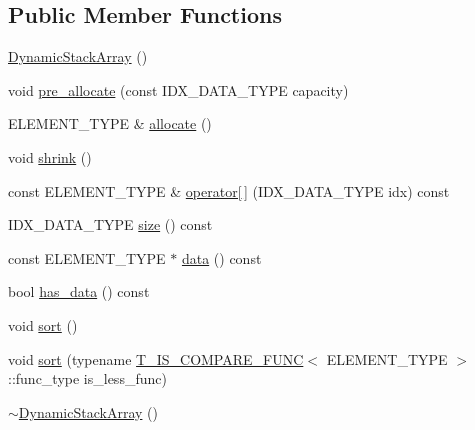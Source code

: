 \subsection*{Public Member Functions}
\begin{DoxyCompactItemize}
\item 
\hyperlink{classuva_1_1utils_1_1containers_1_1_dynamic_stack_array_a559a9117409413c793d43d430b0cf48e}{Dynamic\+Stack\+Array} ()
\item 
void \hyperlink{classuva_1_1utils_1_1containers_1_1_dynamic_stack_array_ae01b76b3d4f10a240ce5abcbf0d3c970}{pre\+\_\+allocate} (const I\+D\+X\+\_\+\+D\+A\+T\+A\+\_\+\+T\+Y\+P\+E capacity)
\item 
E\+L\+E\+M\+E\+N\+T\+\_\+\+T\+Y\+P\+E \& \hyperlink{classuva_1_1utils_1_1containers_1_1_dynamic_stack_array_ae14a94e483eccaae837a646df439b130}{allocate} ()
\item 
void \hyperlink{classuva_1_1utils_1_1containers_1_1_dynamic_stack_array_a17c9906bc5954c4db965daf52d64898a}{shrink} ()
\item 
const E\+L\+E\+M\+E\+N\+T\+\_\+\+T\+Y\+P\+E \& \hyperlink{classuva_1_1utils_1_1containers_1_1_dynamic_stack_array_a187b75984ffc7bf1321fea044e83da82}{operator\mbox{[}$\,$\mbox{]}} (I\+D\+X\+\_\+\+D\+A\+T\+A\+\_\+\+T\+Y\+P\+E idx) const 
\item 
I\+D\+X\+\_\+\+D\+A\+T\+A\+\_\+\+T\+Y\+P\+E \hyperlink{classuva_1_1utils_1_1containers_1_1_dynamic_stack_array_abfad40d7561e68c27b673e388c42596a}{size} () const 
\item 
const E\+L\+E\+M\+E\+N\+T\+\_\+\+T\+Y\+P\+E $\ast$ \hyperlink{classuva_1_1utils_1_1containers_1_1_dynamic_stack_array_a9930b438bcfea31e0fe4a715e2a2e1a1}{data} () const 
\item 
bool \hyperlink{classuva_1_1utils_1_1containers_1_1_dynamic_stack_array_acd4fa0d280bca1521672c184a60e9221}{has\+\_\+data} () const 
\item 
void \hyperlink{classuva_1_1utils_1_1containers_1_1_dynamic_stack_array_aec02d20396f5630717f7a319fe691eb8}{sort} ()
\item 
void \hyperlink{classuva_1_1utils_1_1containers_1_1_dynamic_stack_array_ac387577f12ccfca7b57b39b19e798f20}{sort} (typename \hyperlink{structuva_1_1utils_1_1containers_1_1utils_1_1_t___i_s___c_o_m_p_a_r_e___f_u_n_c}{T\+\_\+\+I\+S\+\_\+\+C\+O\+M\+P\+A\+R\+E\+\_\+\+F\+U\+N\+C}$<$ E\+L\+E\+M\+E\+N\+T\+\_\+\+T\+Y\+P\+E $>$\+::func\+\_\+type is\+\_\+less\+\_\+func)
\item 
\hyperlink{classuva_1_1utils_1_1containers_1_1_dynamic_stack_array_a2544894ec26a78670af76d016a3be7ab}{$\sim$\+Dynamic\+Stack\+Array} ()
\end{DoxyCompactItemize}
